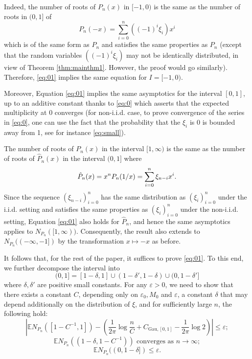 \documentclass[12pt, reqno]{amsart}
\theoremstyle{plain}
\theoremstyle{definition}
\newcommand\E{{\mathbb{E}}}
\newcommand{\ep}{\varepsilon}
\begin{document}
  Indeed, the number of roots of $P_n(x)$ in $[-1, 0)$ is the same as the number of roots in $(0, 1]$ of 
 $$P_n(-x) =\sum_{i=0}^{n} ((-1)^{i}\xi_i) x^i$$
 which is of the same form as $P_n$ and satisfies the same properties as $P_n$ (except that the random variables  $ ((-1)^{i}\xi_i) $ may not be identically distributed, in view of Theorem \ref{thm:mainthm1}. However, the proof would go similarly). Therefore, \eqref{eq:01} implies the same equation for $I = [-1, 0)$.
 
Moreover, Equation \eqref{eq:01} implies the same asymptotics for the interval $[0, 1]$, up to an additive constant thanks to \eqref{eq:0} which asserts that the expected multiplicity at $0$ converges (for non-i.i.d. case, to prove convergence of the series in \eqref{eq:0}, one can use the fact that the probability that the $\xi_i$ is 0 is bounded away from 1, see for instance \eqref{eq:small}). 

The number of roots of $P_n(x)$ in the interval $[1, \infty)$ is the same as the number of roots of $\hat P_n(x)$ in the interval $(0, 1]$ where
 \begin{equation}
 \hat P_n(x) = x^{n} P_n(1/x) = \sum_{i=0}^{n} \xi_{n-i} x^{i}.\notag
 \end{equation}
 Since the sequence $(\xi_{n-i})_{i=0}^{n}$ has the same distribution as  $(\xi_{i})_{i=0}^{n}$ under the i.i.d.  setting and satisfies the same properties as $(\xi_{i})_{i=0}^{n}$ under the non-i.i.d.  setting, Equation \eqref{eq:01} also holds for $\hat P_n$, and hence the same asymptotics applies to $N_{P_n}([1, \infty))$. Consequently, the result also extends to $N_{P_n}((-\infty, -1])$ by the transformation $x\mapsto -x$ as before.
 
 
 \vspace{5mm}
 
It follows that, for the rest of the paper, it suffices to prove \eqref{eq:01}. To this end, we further decompose the interval into
$$(0, 1]= [1-\delta, 1] \cup (1-\delta', 1-\delta) \cup (0, 1-\delta'] $$
where $\delta, \delta'$ are positive small constants. For any $\ep>0$, we need to show that there exists a constant $C$, depending only on $\ep_0, M_0$ and $\ep$, a constant $\delta$ that may depend additionally on the distribution of $\xi$, and for sufficiently large $n$, the following hold:
\begin{equation}
	\left |	 \E N_{P_n}([1-C^{-1}, 1]) - \left (\frac{1}{2\pi}\log\frac{n}{C}+ C_{\mathrm{Gau}, [0, 1]}- \frac{1}{2\pi}\log 2\right ) \right |\le \ep; \label{eq:uni}
\end{equation}
\begin{equation}
	\E N_{P_n}((1-\delta, 1-C^{-1})) \text{ converges as $n\to\infty$};\label{eq:far0}
\end{equation}
\begin{equation}
	\E N_{P_n}((0, 1-\delta])   \le \ep.\label{eq:near0}
\end{equation}
\end{document}
